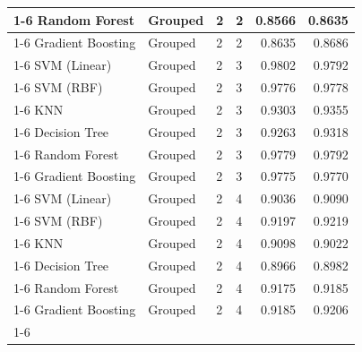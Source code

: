 \begin{table}
\begin{tabular}{llllrr}
\cline{1-6} \cline{2-6} \cline{3-6}
Random Forest & Grouped & 2 & 2 & 0.8566 & 0.8635 \\
\cline{1-6} \cline{2-6} \cline{3-6}
Gradient Boosting & Grouped & 2 & 2 & 0.8635 & 0.8686 \\
\cline{1-6} \cline{2-6} \cline{3-6}
SVM (Linear) & Grouped & 2 & 3 & 0.9802 & 0.9792 \\
\cline{1-6} \cline{2-6} \cline{3-6}
SVM (RBF) & Grouped & 2 & 3 & 0.9776 & 0.9778 \\
\cline{1-6} \cline{2-6} \cline{3-6}
KNN & Grouped & 2 & 3 & 0.9303 & 0.9355 \\
\cline{1-6} \cline{2-6} \cline{3-6}
Decision Tree & Grouped & 2 & 3 & 0.9263 & 0.9318 \\
\cline{1-6} \cline{2-6} \cline{3-6}
Random Forest & Grouped & 2 & 3 & 0.9779 & 0.9792 \\
\cline{1-6} \cline{2-6} \cline{3-6}
Gradient Boosting & Grouped & 2 & 3 & 0.9775 & 0.9770 \\
\cline{1-6} \cline{2-6} \cline{3-6}
SVM (Linear) & Grouped & 2 & 4 & 0.9036 & 0.9090 \\
\cline{1-6} \cline{2-6} \cline{3-6}
SVM (RBF) & Grouped & 2 & 4 & 0.9197 & 0.9219 \\
\cline{1-6} \cline{2-6} \cline{3-6}
KNN & Grouped & 2 & 4 & 0.9098 & 0.9022 \\
\cline{1-6} \cline{2-6} \cline{3-6}
Decision Tree & Grouped & 2 & 4 & 0.8966 & 0.8982 \\
\cline{1-6} \cline{2-6} \cline{3-6}
Random Forest & Grouped & 2 & 4 & 0.9175 & 0.9185 \\
\cline{1-6} \cline{2-6} \cline{3-6}
Gradient Boosting & Grouped & 2 & 4 & 0.9185 & 0.9206 \\
\cline{1-6} \cline{2-6} \cline{3-6}
\bottomrule
\end{tabular}
\end{table}
